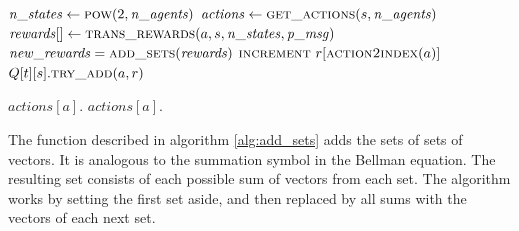 \documentclass{article}
\begin{document}
		\begin{algorithm}[h]
			\begin{algorithmic}[1]
				\State $\mathit{n\_states} \gets \Call{pow}{2, \mathit{n\_agents}}$
				 
				\State $\mathit{actions} \gets \Call{get\_actions}{s, \mathit{n\_agents}}$
				\State $\mathit{rewards}[] \gets \Call{trans\_rewards}{a, s, \mathit{n\_states}, \mathit{p\_msg}}$
				\State $\mathit{new\_rewards} = \Call{add\_sets}{\mathit{rewards}}$
				 
				\State $\Call{increment}{}~r[\Call{action2index}{a}]$ \label{alg:main:increment}
				\State $Q[t][s].\Call{try\_add}{a, r}$ 
				\EndFor
				\EndIf
				\EndFor
				\EndFor
				\EndFor
				\EndProcedure
			\end{algorithmic}
			\label{alg:main}
		\end{algorithm}

		\begin{algorithm}[h!]
			\begin{algorithmic}[1]
				\State \Return {}
				\State \Return {}
				\State $\mathit{actions}[a].$
				\EndIf
				\EndFor
				\State $\mathit{actions}[a].$
				\State {} 
				\EndProcedure
			\end{algorithmic}
			\label{alg:add_v}
		\end{algorithm}

		\begin{multicols}{2}
		The function described in algorithm \ref{alg:add_sets} adds the sets of
		sets of vectors. It is analogous to the summation symbol in the Bellman
		equation. The resulting set consists of each possible sum of vectors from
		each set. The algorithm works by setting the first set aside, and then
		replaced by all sums with the vectors of each next set.
		\end{multicols}
\end{document}
